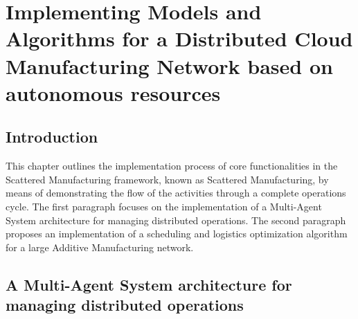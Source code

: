 \chapter{Implementing Models and Algorithms for a Distributed Cloud Manufacturing Network based on autonomous resources}
\label{chapter4}
\section{Introduction}
This chapter outlines the implementation process of core functionalities in the Scattered Manufacturing framework, known as Scattered Manufacturing, by means of demonstrating the flow of the activities through a complete operations cycle. The first paragraph focuses on the implementation of a Multi-Agent System architecture for managing distributed operations. The second paragraph proposes an implementation of a scheduling and logistics optimization algorithm for a large Additive Manufacturing network.
\section{A Multi-Agent System architecture for managing distributed operations}
